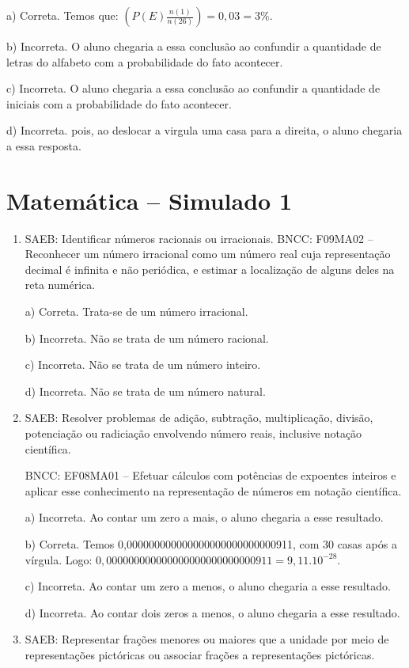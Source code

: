 \begin{enumerate}
a) Correta. Temos que: $(P(E)\frac{n(1)}{n(26)}) = 0,03 = 3\%$.

b) Incorreta. O aluno chegaria a essa conclusão ao confundir a
quantidade de letras do alfabeto com a probabilidade do fato acontecer.

c) Incorreta. O aluno chegaria a essa conclusão ao confundir a
quantidade de iniciais com a probabilidade do fato acontecer.

d) Incorreta. pois, ao deslocar a virgula uma casa para a direita, o
aluno chegaria a essa resposta.
\end{enumerate}


\section*{Matemática – Simulado 1}
\begin{enumerate}
\item SAEB: Identificar números racionais ou irracionais. BNCC: F09MA02 --
Reconhecer um número irracional como um número real cuja representação
decimal é infinita e não periódica, e estimar a localização de alguns
deles na reta numérica.

a) Correta. Trata-se de um número irracional.

b) Incorreta. Não se trata de um número racional.

c) Incorreta. Não se trata de um número inteiro.

d) Incorreta. Não se trata de um número natural.
\item SAEB: Resolver problemas de adição, subtração, multiplicação, divisão,
potenciação ou radiciação envolvendo número reais, inclusive notação
científica.

BNCC: EF08MA01 -- Efetuar cálculos com potências de expoentes inteiros e
aplicar esse conhecimento na representação de números em notação
científica.

a) Incorreta. Ao contar um zero a mais, o aluno chegaria a
esse resultado.

b) Correta. Temos 0,000000000000000000000000000911, com 30 casas após a vírgula.
Logo: $0,000000000000000000000000000911 = 9,11 . 10^{-28}$.

c) Incorreta. Ao contar um zero a menos, o aluno chegaria a
esse resultado.

d) Incorreta. Ao contar dois zeros a menos, o aluno chegaria a
esse resultado.
\item SAEB: Representar frações menores ou maiores que a unidade por meio de
representações pictóricas ou associar frações a representações
pictóricas.


\end{enumerate}
